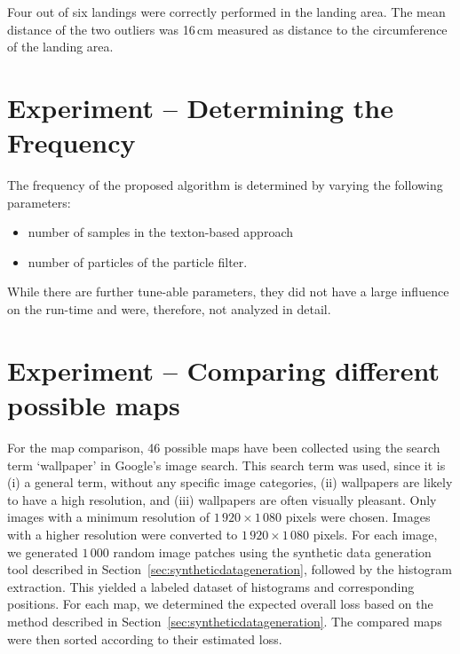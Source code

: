 \documentclass[11pt]{report}
\begin{document}


Four out of six landings were correctly performed in the landing
area. The mean distance of the two outliers was 16\,cm measured as
distance to the circumference of the landing area.
%

\section{Experiment -- Determining the Frequency}

The frequency of the proposed algorithm is determined by varying the
following parameters:
\begin{itemize}
\item number of samples in the texton-based approach
\item number of particles of the particle filter.
\end{itemize}

While there are further tune-able parameters, they did not have a
large influence on the run-time and were, therefore, not analyzed in
detail.

\section{Experiment -- Comparing different possible maps}

For the map comparison, 46 possible maps have been collected using the
search term `wallpaper' in Google's image search. This search term was
used, since it is (i) a general term, without any specific image
categories, (ii) wallpapers are likely to have a high resolution, and
(iii) wallpapers are often visually pleasant. Only images with a
minimum resolution of $1\,920 \times 1\,080$ pixels were
chosen. Images with a higher resolution were converted to
$1\,920 \times 1\,080$ pixels. For each image, we generated $1\,000$
random image patches using the synthetic data generation tool
described in Section~\ref{sec:syntheticdatageneration}, followed by
the histogram extraction. This yielded a labeled dataset of histograms
and corresponding positions. For each map, we determined the expected
overall loss based on the method described in
Section~\ref{sec:syntheticdatageneration}. The compared maps were then
sorted according to their estimated loss.
\end{document}
